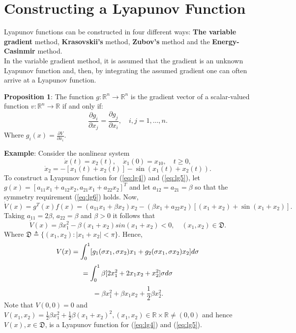\documentclass[a4paper]{report}
\theoremstyle{definition}
\begin{document}
\section{Constructing a Lyapunov Function}
Lyapunov functions can be constructed in four different ways: \textbf{The variable gradient} method, \textbf{Krasovskii's} method, \textbf{Zubov's} method and the \textbf{Energy-Casinmir} method.
\\
In the variable gradient method, it is assumed that the gradient is an unknown Lyapunov function and, then, by integrating the assumed gradient one can often arrive at a Lyapunov function.
\\
\begin{mdframed}[backgroundcolor=airforceblue!25] 
\textbf{Proposition 1}: The function $g:\mathbb{R}^n\rightarrow\mathbb{R}^n$ is the gradient vector of a scalar-valued function $v:\mathbb{R}^n\rightarrow\mathbb{R}$ if and only if:
\begin{equation}
\frac{\partial g_i}{\partial x_j}=\frac{\partial g_j}{\partial x_i} ,\quad  i,j=1,\dots,n.
\label{eq:lg6}
\end{equation}
Where $g_i(x)=\frac{\partial V}{\partial x_i}$.
\end{mdframed}
\textbf{Example}: Consider the nonlinear system
\begin{equation}
\dot{x}(t)=x_2(t), \quad \dot{x}_1(0)=x_{10}, \quad t\ge0,
\label{eq:lg4}
\end{equation}
\begin{equation}
\dot{x}_2=-[x_1(t)+x_2(t)]-\sin(x_1(t)+x_2(t)).
\label{eq:lg5}
\end{equation}
To construct a Lyapunov function for (\ref{eq:lg4}) and (\ref{eq:lg5}), let $g(x)=[a_{1 1}x_1+a_{1 2}x_2, a_{2 1}x_1+a_{2 2}x_2]^T$ and let $a_{12}=a_{21}=\beta$ so that the symmetry requirement (\ref{eq:lg6}) holds. Now,
\begin{equation}
\dot{V}(x)=g^T (x)f(x)=(a_{11}x_1+\beta x_2)x_2-(\beta x_1+a_{22}x_2)[(x_1+x_2)+\sin(x_1+x_2)].
\end{equation}
Taking $a_{11}=2\beta$, $a_{22}=\beta$ and $\beta>0$ it follows that 
\begin{equation}
\dot{V}(x)=\beta x_1^2-\beta(x_1+x_2)sin(x_1+x_2)<0, \quad (x_1,x_2)\in \mathfrak{D}. 
\end{equation}
Where $\mathfrak{D}\triangleq \{(x_1,x_2):|x_1+x_2|<\pi \}$. Hence,
\begin{equation}
V(x)=\int_{0}^{1} [g_1(\sigma x_1,\sigma x_2)x_1+g_2(\sigma x_1,\sigma x_2)x_2]d\sigma \notag
\end{equation}
\begin{equation}
=\int_{0}^{1} \beta[2x_1^2+2x_1x_2+x_2^2]\sigma d\sigma \notag
\end{equation}
\begin{equation}
=\beta x_1^2+\beta x_1x_2+\frac{1}{2}\beta x_2^2. 
\end{equation}
Note that $V(0,0)=0$ and $V(x_1,x_2)=\frac{1}{2}\beta x_1^2+\frac{1}{2}\beta(x_1+x_2)^2, (x_1,x_2)\in \mathbb{R}\times\mathbb{R}\not= (0,0)$ and hence $V(x), x\in \mathfrak{D}$, is a Lyapunov function for (\ref{eq:lg4}) and (\ref{eq:lg5}).
\end{document}
